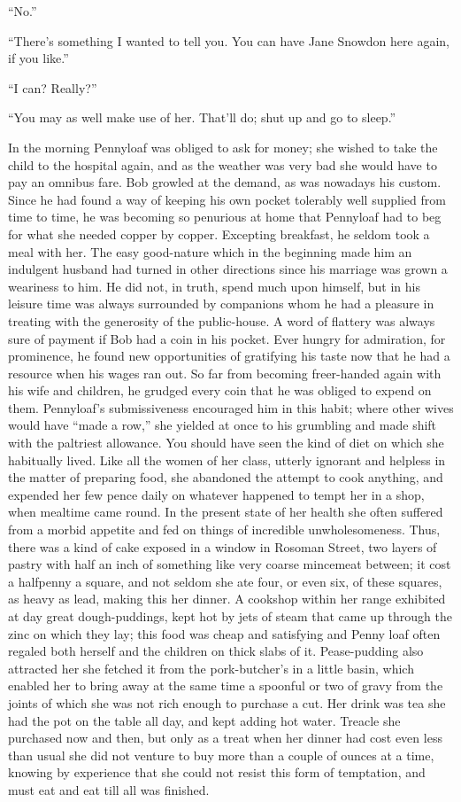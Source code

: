 ``No.''

``There's something I wanted to tell you. You can have Jane Snowdon here
again, if you like.''

{}``I can? Really?''

``You may as well make use of her. That'll do; shut up and go to
sleep.''

In the morning Pennyloaf was obliged to ask for money; she wished to
take the child to the hospital again, and as the weather was very bad
she would have to pay an omnibus fare. Bob growled at the demand, as was
nowadays his custom. Since he had found a way of keeping his own pocket
tolerably well supplied from time to time, he was becoming so penurious
at home that Pennyloaf had to beg for what she needed copper by copper.
Excepting breakfast, he seldom took a meal with her. The easy
good-nature which in the beginning made him an indulgent husband had
turned in other directions since his marriage was grown a weariness to
him. He did not, in truth, spend much upon himself, but in his leisure
time was always surrounded by companions whom he had a pleasure in
treating with the generosity of the public-house. A word of flattery was
always sure of payment if Bob had a coin in his pocket. Ever hungry for
admiration, for prominence, he found new opportunities of gratifying his
{}taste now that he had a resource when his wages ran out. So far from
becoming freer-handed again with his wife and children, he grudged every
coin that he was obliged to expend on them. Pennyloaf's submissiveness
encouraged him in this habit; where other wives would have ``made a
row,'' she yielded at once to his grumbling and made shift with the
paltriest allowance. You should have seen the kind of diet on which she
habitually lived. Like all the women of her class, utterly ignorant and
helpless in the matter of preparing food, she abandoned the attempt to
cook anything, and expended her few pence daily on whatever happened to
tempt her in a shop, when mealtime came round. In the present state of
her health she often suffered from a morbid appetite and fed on things
of incredible unwholesomeness. Thus, there was a kind of cake exposed in
a window in Rosoman Street, two layers of pastry with half an inch of
something like very coarse mincemeat between; it cost a halfpenny a
square, and not seldom she ate four, or even six, of these squares, as
heavy as lead, making this her dinner. A cookshop within her range
exhibited at {}day great dough-puddings, kept hot by jets of steam that
came up through the zinc on which they lay; this food was cheap and
satisfying and Penny loaf often regaled both herself and the children on
thick slabs of it. Pease-pudding also attracted her she fetched it from
the pork-butcher's in a little basin, which enabled her to bring away at
the same time a spoonful or two of gravy from the joints of which she
was not rich enough to purchase a cut. Her drink was tea she had the pot
on the table all day, and kept adding hot water. Treacle she purchased
now and then, but only as a treat when her dinner had cost even less
than usual she did not venture to buy more than a couple of ounces at a
time, knowing by experience that she could not resist this form of
temptation, and must eat and eat till all was finished.

